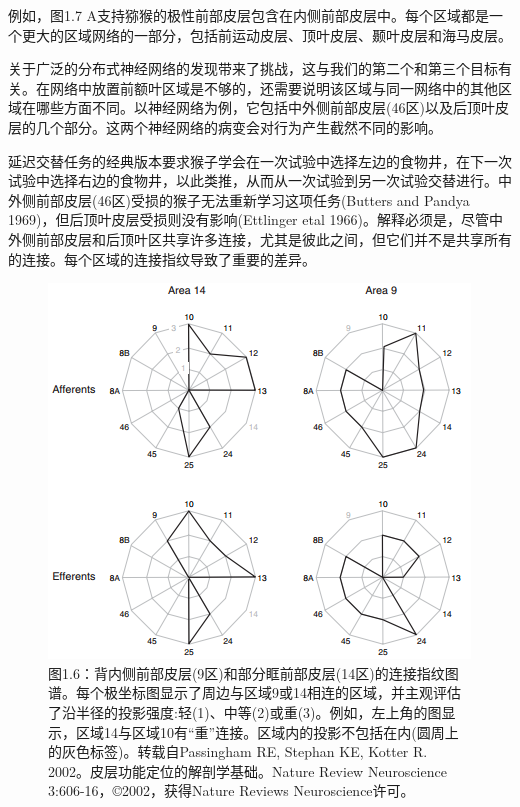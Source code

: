 \par
例如，图1.7 A支持猕猴的极性前部皮层包含在内侧前部皮层中。每个区域都是一个更大的区域网络的一部分，包括前运动皮层、顶叶皮层、颞叶皮层和海马皮层。

\par
关于广泛的分布式神经网络的发现带来了挑战，这与我们的第二个和第三个目标有关。在网络中放置前额叶区域是不够的，还需要说明该区域与同一网络中的其他区域在哪些方面不同。以神经网络为例，它包括中外侧前部皮层(46区)以及后顶叶皮层的几个部分。这两个神经网络的病变会对行为产生截然不同的影响。

\par
延迟交替任务的经典版本要求猴子学会在一次试验中选择左边的食物井，在下一次试验中选择右边的食物井，以此类推，从而从一次试验到另一次试验交替进行。中外侧前部皮层(46区)受损的猴子无法重新学习这项任务(Butters and Pandya 1969)，但后顶叶皮层受损则没有影响(Ettlinger etal 1966)。解释必须是，尽管中外侧前部皮层和后顶叶区共享许多连接，尤其是彼此之间，但它们并不是共享所有的连接。每个区域的连接指纹导致了重要的差异。


\begin{figure}[!htb]
	\centering
	\includegraphics[width=0.5\linewidth]{image_pfc/Fig_1_6}
	\caption*{图1.6：背内侧前部皮层(9区)和部分眶前部皮层(14区)的连接指纹图谱。每个极坐标图显示了周边与区域9或14相连的区域，并主观评估了沿半径的投影强度:轻(1)、中等(2)或重(3)。例如，左上角的图显示，区域14与区域10有“重”连接。区域内的投影不包括在内(圆周上的灰色标签)。转载自Passingham RE, Stephan KE, Kotter R. 2002。皮层功能定位的解剖学基础。Nature Review Neuroscience 3:606-16，©2002，获得Nature Reviews Neuroscience许可。}
\end{figure}



